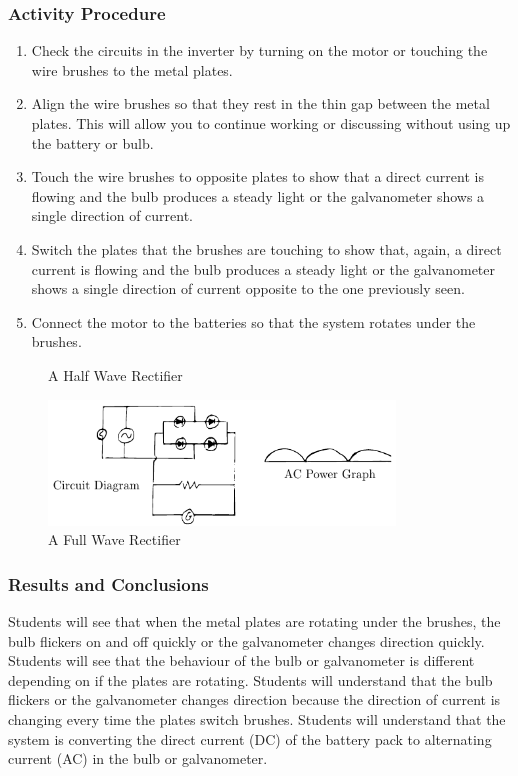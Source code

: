 \subsubsection*{Activity Procedure}
\begin{enumerate}
\item{Check the circuits in the inverter by turning on the motor or touching the wire brushes to the metal plates.} 
\item{Align the wire brushes so that they rest in the thin gap between the metal plates. This will allow you to continue working or discussing without using up the battery or bulb.} 
\item{Touch the wire brushes to opposite plates to show that a direct current is flowing and the bulb produces a steady light or the galvanometer shows a single direction of current.} 
\item{Switch the plates that the brushes are touching to show that, again, a direct current is flowing and the bulb produces a steady light or the galvanometer shows a single direction of current opposite to the one previously seen.} 
\item{Connect the motor to the batteries so that the system rotates under the brushes.} 
\end{enumerate}

\begin{figure}
\begin{center}
\def\svgwidth{150pt}

\caption{A Half Wave Rectifier}
\label{fig:half-wave-rectifier}
\end{center}
\end{figure}

\begin{figure}
\begin{center}
\includegraphics{./img/full-wave-rectifier.png}
\caption{A Full Wave Rectifier}
\label{fig:full-wave-rectifier}
\end{center}
\end{figure}

\subsubsection*{Results and Conclusions}
Students will see that when the metal plates are rotating under the brushes, the bulb flickers on and off quickly or the galvanometer changes direction quickly.  
Students will see that the behaviour of the bulb or galvanometer is different depending on if the plates are rotating.  
Students will understand that the bulb flickers or the galvanometer changes direction because the direction of current is changing every time the plates switch brushes.  
Students will understand that the system is converting the direct current (DC) of the battery pack to alternating current (AC) in the bulb or galvanometer.  

